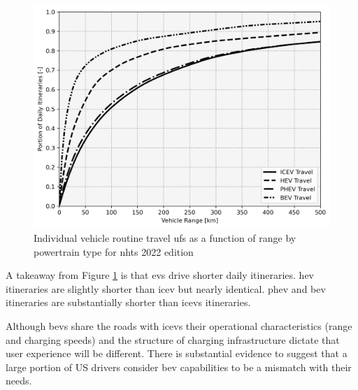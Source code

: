 \begin{figure}[H]
	\centering
	\includegraphics[width = \linewidth]{figs/UF_2022_km.png}
	\caption{Individual vehicle routine travel \glspl{uf} as a function of range by powertrain type for \gls{nhts} 2022 edition}
	\label{fig:utility_factors}
\end{figure}

A takeaway from Figure \ref{fig:utility_factors} is that \glspl{ev} drive shorter daily itineraries. \gls{hev} itineraries are slightly shorter than \gls{icev} but nearly identical. \gls{phev} and \gls{bev} itineraries are substantially shorter than \glspl{icev} itineraries.

Although \glspl{bev} share the roads with \glspl{icev} their operational characteristics (range and charging speeds) and the structure of charging infrastructure dictate that user experience will be different. There is substantial evidence to suggest that a large portion of US drivers consider \gls{bev} capabilities to be a mismatch with their needs.